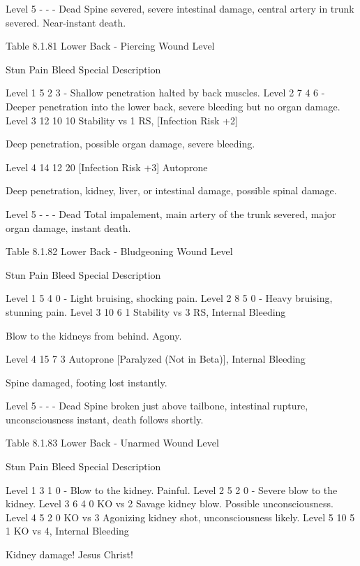 \documentclass[oneside,11pt,english]{book}
\begin{document}
Level 5 - - - Dead Spine severed, severe intestinal damage, central artery in 
trunk severed. Near-instant death. 

 
Table 8.1.81 Lower Back - Piercing 
Wound 
Level 

Stun Pain Bleed Special Description 

Level 1 5 2 3 - Shallow penetration halted by back muscles. 
Level 2 7 4 6 - Deeper penetration into the lower back, severe 
bleeding but no organ damage. 
Level 3 12 10 10 Stability vs 1 RS, 
[Infection Risk +2] 

Deep penetration, possible organ damage, severe 
bleeding. 

Level 4 14 12 20 [Infection Risk +3] 
Autoprone 

 

Deep penetration, kidney, liver, or intestinal 
damage, possible spinal damage. 

Level 5 - - - Dead Total impalement, main artery of the trunk severed, 
major organ damage, instant death. 

 
Table 8.1.82 Lower Back - Bludgeoning 
Wound 
Level 

Stun Pain Bleed Special Description 

Level 1 5 4 0 - Light bruising, shocking pain. 
Level 2 8 5 0 - Heavy bruising, stunning pain. 
Level 3 10 6 1 Stability vs 3 RS, 
Internal Bleeding 

Blow to the kidneys from behind. Agony. 

Level 4 15 7 3 Autoprone 
[Paralyzed (Not in 
Beta)], Internal Bleeding 

Spine damaged, footing lost instantly. 


Level 5 - - - Dead Spine broken just above tailbone, intestinal rupture, 
unconsciousness instant, death follows shortly. 

 
Table 8.1.83 Lower Back - Unarmed 
Wound 
Level 

Stun Pain Bleed Special Description 

Level 1 3 1 0 - Blow to the kidney. Painful. 
Level 2 5 2 0 - Severe blow to the kidney. 
Level 3 6 4 0 KO vs 2 Savage kidney blow. Possible unconsciousness. 
Level 4 5 2 0 KO vs 3 Agonizing kidney shot, unconsciousness 
likely. 
Level 5 10 5 1 KO vs 4, Internal 
Bleeding 

Kidney damage! Jesus Christ! 

 
\end{document}
